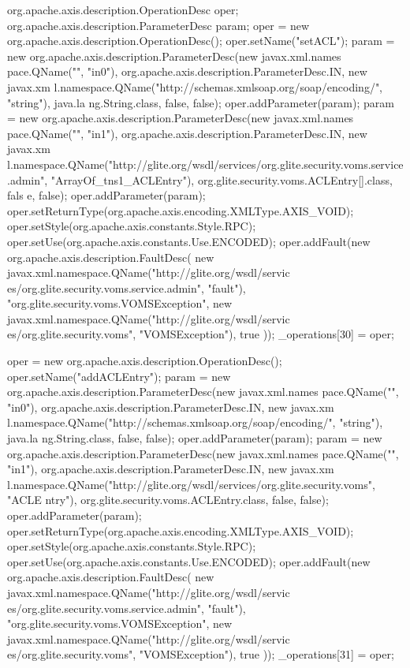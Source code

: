\begin{DoxyCode}
                                             {
        org.apache.axis.description.OperationDesc oper;
        org.apache.axis.description.ParameterDesc param;
        oper = new org.apache.axis.description.OperationDesc();
        oper.setName("setACL");
        param = new org.apache.axis.description.ParameterDesc(new javax.xml.names
      pace.QName("", "in0"), org.apache.axis.description.ParameterDesc.IN, new javax.xm
      l.namespace.QName("http://schemas.xmlsoap.org/soap/encoding/", "string"), java.la
      ng.String.class, false, false);
        oper.addParameter(param);
        param = new org.apache.axis.description.ParameterDesc(new javax.xml.names
      pace.QName("", "in1"), org.apache.axis.description.ParameterDesc.IN, new javax.xm
      l.namespace.QName("http://glite.org/wsdl/services/org.glite.security.voms.service
      .admin", "ArrayOf_tns1_ACLEntry"), org.glite.security.voms.ACLEntry[].class, fals
      e, false);
        oper.addParameter(param);
        oper.setReturnType(org.apache.axis.encoding.XMLType.AXIS_VOID);
        oper.setStyle(org.apache.axis.constants.Style.RPC);
        oper.setUse(org.apache.axis.constants.Use.ENCODED);
        oper.addFault(new org.apache.axis.description.FaultDesc(
                      new javax.xml.namespace.QName("http://glite.org/wsdl/servic
      es/org.glite.security.voms.service.admin", "fault"),
                      "org.glite.security.voms.VOMSException",
                      new javax.xml.namespace.QName("http://glite.org/wsdl/servic
      es/org.glite.security.voms", "VOMSException"), 
                      true
                     ));
        _operations[30] = oper;

        oper = new org.apache.axis.description.OperationDesc();
        oper.setName("addACLEntry");
        param = new org.apache.axis.description.ParameterDesc(new javax.xml.names
      pace.QName("", "in0"), org.apache.axis.description.ParameterDesc.IN, new javax.xm
      l.namespace.QName("http://schemas.xmlsoap.org/soap/encoding/", "string"), java.la
      ng.String.class, false, false);
        oper.addParameter(param);
        param = new org.apache.axis.description.ParameterDesc(new javax.xml.names
      pace.QName("", "in1"), org.apache.axis.description.ParameterDesc.IN, new javax.xm
      l.namespace.QName("http://glite.org/wsdl/services/org.glite.security.voms", "ACLE
      ntry"), org.glite.security.voms.ACLEntry.class, false, false);
        oper.addParameter(param);
        oper.setReturnType(org.apache.axis.encoding.XMLType.AXIS_VOID);
        oper.setStyle(org.apache.axis.constants.Style.RPC);
        oper.setUse(org.apache.axis.constants.Use.ENCODED);
        oper.addFault(new org.apache.axis.description.FaultDesc(
                      new javax.xml.namespace.QName("http://glite.org/wsdl/servic
      es/org.glite.security.voms.service.admin", "fault"),
                      "org.glite.security.voms.VOMSException",
                      new javax.xml.namespace.QName("http://glite.org/wsdl/servic
      es/org.glite.security.voms", "VOMSException"), 
                      true
                     ));
        _operations[31] = oper;

}
\end{DoxyCode}
